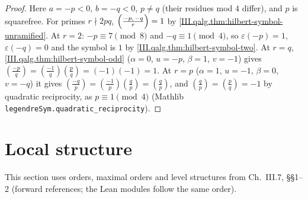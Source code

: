 \begin{theorem}
\end{theorem}
\begin{proof}
Here $a=-p<0$, $b=-q<0$, $p\ne q$ (their residues mod $4$ differ), and $p$ is squarefree. For primes $r\nmid2pq$, $\Bigl(\tfrac{-p,\,-q}{r}\Bigr)=1$ by
\cref{III.qalg.thm:hilbert-symbol-unramified}. At $r=2$: $-p\equiv7\pmod8$ and $-q\equiv1\pmod4$, so $\varepsilon(-p)=1$, $\varepsilon(-q)=0$ and the symbol is
$1$ by \cref{III.qalg.thm:hilbert-symbol-two}. At $r=q$, \cref{III.qalg.thm:hilbert-symbol-odd} ($\alpha=0$, $u=-p$, $\beta=1$, $v=-1$) gives
$(\frac{-p}q)=(\frac{-1}q)(\frac pq)=(-1)(-1)=1$. At $r=p$ ($\alpha=1$, $u=-1$, $\beta=0$, $v=-q$) it gives $(\frac{-q}p)=(\frac{-1}p)(\frac qp)=(\frac qp)$,
and $(\frac qp)=(\frac pq)=-1$ by quadratic reciprocity, as $p\equiv1\pmod4$ (Mathlib \texttt{legendreSym.quadratic\_reciprocity}).
\end{proof}

\section{Local structure}\label{sec:qalg-local}

\noindent This section uses orders, maximal orders and level structures from Ch.~III.7, §§1--2 (forward references; the Lean modules follow the
same order).

\begin{definition}
\end{definition}

